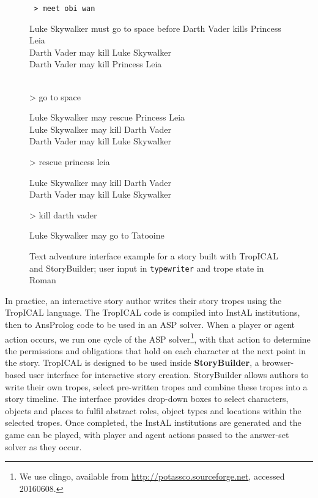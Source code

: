 \begin{figure}[!t]
{\begin{minipage}{0.95\columnwidth}
\begin{flushleft}\tt\small
> meet obi wan\\\smallskip
\hfill\begin{minipage}{0.95\columnwidth}\flushright\rm\noindent
Luke Skywalker must go to space before Darth Vader kills Princess Leia\\
Darth Vader may kill Luke Skywalker\\
Darth Vader may kill Princess Leia
\end{minipage}\\
> go to space\\\smallskip
\hfill\begin{minipage}{\columnwidth}\flushright\rm
Luke Skywalker may rescue Princess Leia\\
Luke Skywalker may kill Darth Vader\\
Darth Vader may kill Luke Skywalker
\end{minipage}
> rescue princess leia\\\smallskip
\hfill\begin{minipage}{\columnwidth}\flushright\rm
Luke Skywalker may kill Darth Vader\\
Darth Vader may kill Luke Skywalker
\end{minipage}
> kill darth vader\\\smallskip
\hfill\begin{minipage}{\columnwidth}\flushright\rm
Luke Skywalker may go to Tatooine
\end{minipage}
\end{flushleft}
\end{minipage}
}
\caption{Text adventure interface example for a story built with TropICAL and StoryBuilder; user input in {\tt typewriter} and trope state in Roman} \label{fig:text}
\end{figure}

In practice, an interactive story author writes their story tropes using the TropICAL language. The TropICAL code is compiled into InstAL institutions, then to AnsProlog code to be used in an ASP solver. When a player or agent action occurs, we run one cycle of the ASP solver\footnote{We use clingo, available from \url{http://potassco.sourceforge.net}, accessed 20160608.}, with that action to determine the permissions and obligations that hold on each character at the next point in the story.
TropICAL is designed to be used inside \textbf{StoryBuilder}, a browser-based user interface for interactive story creation. StoryBuilder allows authors to write their own tropes, select pre-written tropes and combine these tropes into a story timeline. The interface provides drop-down boxes to select characters, objects and places to fulfil abstract roles, object types and locations within the selected tropes. Once completed, the InstAL institutions are generated and the game can be played, with player and agent actions passed to the answer-set solver as they occur.

